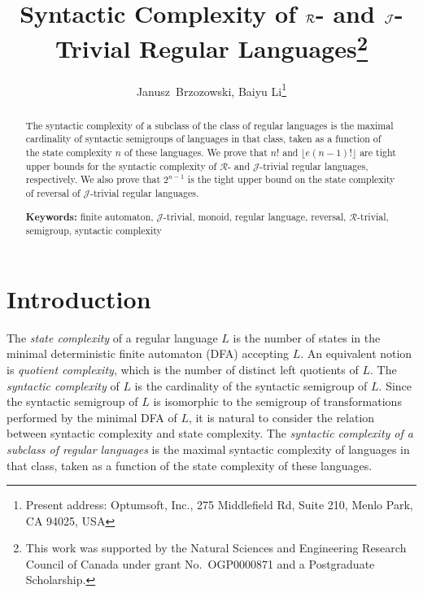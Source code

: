 \documentclass{llncs}
\title{Syntactic Complexity of $\gR$- and $\gJ$-Trivial Regular Languages\thanks{This work was supported by the Natural Sciences and Engineering Research Council of Canada under grant No.~OGP0000871 and  a Postgraduate Scholarship.
}
}
\author{Janusz~Brzozowski, Baiyu Li\thanks{Present address: 
Optumsoft, Inc.,
275 Middlefield Rd, Suite 210, Menlo Park, CA 94025, USA}
}
\institute{David R. Cheriton School of Computer Science, University of Waterloo \\
Waterloo, ON, Canada N2L 3G1\\
\{{\tt \{brzozo, b5li\}@uwaterloo.ca} \}
}
\newcommand{\noin}{\noindent}
\newcommand{\gR}{{\mathcal R}}
\newcommand{\gJ}{{\mathcal J}}
\begin{document}
\maketitle
\begin{abstract}
The syntactic complexity of a subclass of the class of regular languages is the maximal cardinality of syntactic semigroups of languages in that class, taken as a function of the state complexity $n$ of these languages.
We prove that $n!$ and $\lfloor e(n-1)! \rfloor$ are tight upper bounds for 
the syntactic complexity of $\gR$- and $\gJ$-trivial regular languages, respectively. 
We also prove that $2^{n-1}$ is the tight upper bound on the state complexity of reversal of $\gJ$-trivial regular languages. 
\bigskip

\noin
{\bf Keywords:}
finite automaton, $\gJ$-trivial, monoid, regular language, reversal, $\gR$-trivial, semigroup, syntactic complexity 
\end{abstract}


\section{Introduction}\label{sec:intro}

The \emph{state complexity} of a regular language $L$ is the number of states in the minimal deterministic finite automaton (DFA) accepting $L$. An equivalent notion is \emph{quotient complexity}, which is the number of distinct left quotients of $L$. 
The \emph{syntactic complexity} of $L$ is the cardinality of the syntactic semigroup of $L$. 
Since the syntactic semigroup of $L$ is isomorphic to the semigroup of transformations performed by the minimal DFA of $L$, it is natural to consider the relation between syntactic complexity and state complexity. The \emph{syntactic complexity of a subclass of regular languages} is the maximal syntactic complexity of languages in that class, taken as a function of the state complexity of these languages.
\end{document}

